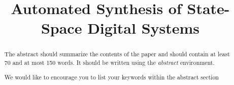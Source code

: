 \documentclass[runningheads,a4paper]{llncs}
\newcommand{\keywords}[1]{\par\addvspace\baselineskip
\noindent\keywordname\enspace\ignorespaces#1}
\begin{document}
\mainmatter  %

\title{Automated Synthesis of State-Space Digital Systems}


%
%
%


%
%

\maketitle


\begin{abstract}
The abstract should summarize the contents of the paper and should
contain at least 70 and at most 150 words. It should be written using the
\emph{abstract} environment.
\keywords{We would like to encourage you to list your keywords within
the abstract section}
\end{abstract}
\end{document}
